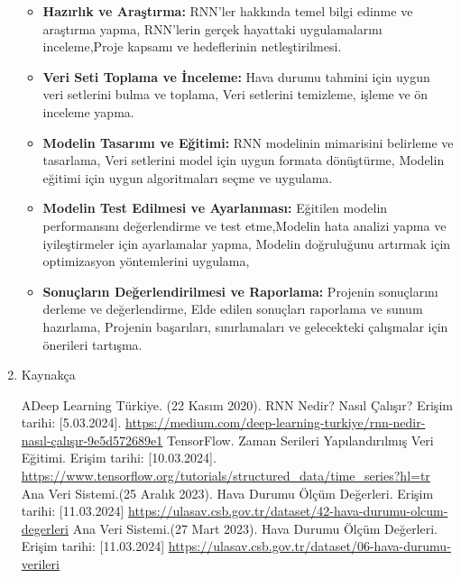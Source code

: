 \documentclass[12pt,a4paper]{article}
\begin{document}
\begin{enumerate}
\begin{figure}[h]
  \end{figure}
  \begin{itemize}
        
      \item 
      {\bf\fontsize{12pt}{14pt}\selectfont Hazırlık ve Araştırma:} 
      RNN'ler hakkında temel bilgi edinme ve araştırma yapma, RNN'lerin gerçek hayattaki uygulamalarını inceleme,Proje kapsamı ve hedeflerinin netleştirilmesi.
      \item {\bf\fontsize{12pt}{14pt}\selectfont Veri Seti Toplama ve İnceleme:}  
      Hava durumu tahmini için uygun veri setlerini bulma ve toplama, Veri setlerini temizleme, işleme ve ön inceleme yapma.
      \item {\bf\fontsize{12pt}{14pt}\selectfont  Modelin Tasarımı ve Eğitimi:} 
      RNN modelinin mimarisini belirleme ve tasarlama,
Veri setlerini model için uygun formata dönüştürme, Modelin eğitimi için uygun algoritmaları seçme ve uygulama.
      \item {\bf\fontsize{12pt}{14pt}\selectfont  Modelin Test Edilmesi ve Ayarlanması:} 
      Eğitilen modelin performansını değerlendirme ve test etme,Modelin hata analizi yapma ve iyileştirmeler için ayarlamalar yapma, Modelin doğruluğunu artırmak için optimizasyon yöntemlerini uygulama,
      
      \item {\bf\fontsize{12pt}{14pt}\selectfont Sonuçların Değerlendirilmesi ve Raporlama:}  
      Projenin sonuçlarını derleme ve değerlendirme,
Elde edilen sonuçları raporlama ve sunum hazırlama,
Projenin başarıları, sınırlamaları ve gelecekteki çalışmalar için önerileri tartışma.
    
  \end{itemize}
  \item Kaynakça
  \begin{itemize}
   ADeep Learning Türkiye. (22 Kasım 2020). RNN Nedir? Nasıl Çalışır? Erişim tarihi: [5.03.2024].
  \url{  https://medium.com/deep-learning-turkiye/rnn-nedir-nasıl-çalışır-9e5d572689e1}
   TensorFlow. Zaman Serileri Yapılandırılmış Veri Eğitimi. Erişim tarihi: [10.03.2024]. \newline\url{https://www.tensorflow.org/tutorials/structured_data/time_series?hl=tr}
 Ana Veri Sistemi.(25 Aralık 2023). Hava Durumu Ölçüm Değerleri. Erişim tarihi: [11.03.2024] \newline 
\url{ https://ulasav.csb.gov.tr/dataset/42-hava-durumu-olcum-degerleri}
 Ana Veri Sistemi.(27 Mart 2023). Hava Durumu Ölçüm Değerleri. Erişim tarihi: [11.03.2024] \newline  \url{ https://ulasav.csb.gov.tr/dataset/06-hava-durumu-verileri}

  \end{itemize}


  \end{enumerate}
 
\end{document}
